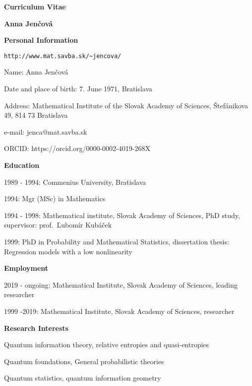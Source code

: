 \documentclass[12pt]{article}
\begin{document}
\centerline{\large \textbf{Curriculum Vitae}}
\vskip 5pt
\centerline{\large \textbf{Anna Jen\v cov\'a}}
\vskip 0.5cm
\noindent
\textbf{Personal Information}


\begin{verbatim}http://www.mat.savba.sk/~jencova/\end{verbatim}




\begin{description}[noitemsep,leftmargin=3cm, font=\normalfont]
\item{Name:} Anna Jen\v cov\'a
\item{Date and place of birth:} 7. June 1971,  Bratislava
\item{Address:} Mathematical Institute of the Slovak Academy of Sciences, \v Stef\'anikova 49, 814 73 Bratislava
\item{e-mail:} jenca@mat.savba.sk
\vskip 5pt
\item{ORCID:}   https://orcid.org/0000-0002-4019-268X 

\end{description}

\noindent
\textbf{Education}
\begin{description}[noitemsep,leftmargin=2.6cm, font=\normalfont]
\item{1989 - 1994:} Commenius University,  Bratislava
\item{1994:} Mgr (MSc) in Mathematics
\item{1994 - 1998:} Mathematical institute, Slovak Academy of Sciences, PhD study,
supervisor: prof.~Ľubomír Kub\'a\v cek
\item{1999:} PhD in Probability and Mathematical Statistics, dissertation thesis: Regression models with a low nonlinearity

\end{description}

\noindent
\textbf{Employment}
\begin{description}[noitemsep,leftmargin=3cm, font=\normalfont]
\item{2019 - ongoing:} Mathematical Institute, Slovak Academy of Sciences, leading
researcher
\item{1999 -2019:} Mathematical Institute, Slovak Academy of Sciences, researcher

\end{description}

\noindent
\textbf{Research Interests}
\begin{description}[noitemsep,leftmargin=3cm, font=\normalfont]
\item Quantum information theory, relative entropies and quasi-entropies
\item Quantum foundations, General probabilistic theories
\item Quantum statistics, quantum information geometry

\end{description}
\end{document}
